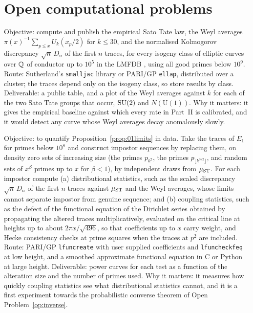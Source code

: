 \section{Open computational problems}

\begin{compproblem}
Objective: compute and publish the empirical Sato Tate law, the Weyl averages $\pi(x)^{-1}\sum_{p\le x}U_k(x_p/2)$ for $k\le30$, and the normalised Kolmogorov discrepancy $\sqrt n\,D_n$ of the first $n$ traces, for every isogeny class of elliptic curves over $\mathbb{Q}$ of conductor up to $10^5$ in the LMFDB \cite{lmfdb}, using all good primes below $10^9$. Route: Sutherland's \texttt{smalljac} library or PARI/GP \texttt{ellap}, distributed over a cluster; the traces depend only on the isogeny class, so store results by class. Deliverable: a public table, and a plot of the Weyl averages against $k$ for each of the two Sato Tate groups that occur, $\mathrm{SU}(2)$ and $N(\mathrm{U}(1))$. Why it matters: it gives the empirical baseline against which every rate in Part~II is calibrated, and it would detect any curve whose Weyl averages decay anomalously slowly.
\end{compproblem}

\begin{compproblem}
Objective: to quantify Proposition~\ref{prop:01limits} in data. Take the traces of $E_1$ for primes below $10^8$ and construct impostor sequences by replacing them, on density zero sets of increasing size (the primes $p_{k^2}$, the primes $p_{\lfloor k^{3/2}\rfloor}$, and random sets of $x^{\beta}$ primes up to $x$ for $\beta<1$), by independent draws from $\mu_{\mathrm{ST}}$. For each impostor compute (a) distributional statistics, such as the scaled discrepancy $\sqrt n\,D_n$ of the first $n$ traces against $\mu_{\mathrm{ST}}$ and the Weyl averages, whose limits cannot separate impostor from genuine sequence; and (b) coupling statistics, such as the defect of the functional equation of the Dirichlet series obtained by propagating the altered traces multiplicatively, evaluated on the critical line at heights up to about $2\pi x/\sqrt{496}$, so that coefficients up to $x$ carry weight, and Hecke consistency checks at prime squares when the traces at $p^2$ are included. Route: PARI/GP \texttt{lfuncreate} with user supplied coefficients and \texttt{lfuncheckfeq} at low height, and a smoothed approximate functional equation in C or Python at large height. Deliverable: power curves for each test as a function of the alteration size and the number of primes used. Why it matters: it measures how quickly coupling statistics see what distributional statistics cannot, and it is a first experiment towards the probabilistic converse theorem of Open Problem~\ref{op:inverse}.
\end{compproblem}

